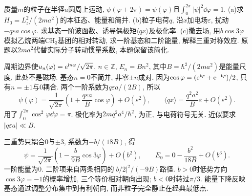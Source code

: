 \begin{exercise}
质量$m$的粒子在半径$a$圆周上运动, $\psi(\varphi+2\pi)=\psi(\varphi)$且$\int_0^{2\pi}|\psi|^2\dd\varphi=1$. (a)求$H_0=L_z^2/(2ma^2)$的本征态、能量和简并. (b)粒子电荷$q$, 沿$x$加电场$\varepsilon$, 扰动$-q\varepsilon a\cos\varphi$. 求基态一阶波函数、诱导偶极矩$\langle qx\rangle$及极化率. (c)撤去场, 用$b\cos3\varphi$模拟乙烷两端$\mathrm{CH}_3$基团的相对转动, 求一阶基态和二阶能量, 解释三重对称效应. 原题以$2ma^2$代替实际分子转动惯量系数, 本题保留该简化.
\end{exercise}
\begin{solution}
周期边界使$u_n(\varphi)=\mathrm e^{\mathrm i n\varphi}/\sqrt{2\pi}$, $n\in\mathbb Z$, $E_n=Bn^2$, 其中$B=\hbar^2/(2ma^2)$是能量尺度, 此处不是磁场. 基态$n=0$不简并, 非零$\pm n$成对. 因为$\cos\varphi=(\mathrm e^{\mathrm i\varphi}+\mathrm e^{-\mathrm i\varphi})/2$, 只有$n=\pm1$与0耦合. 两个一阶系数为$q\varepsilon a/(2B)$, 所以
\[
\psi(\varphi)=\frac1{\sqrt{2\pi}}\left(1+\frac{q\varepsilon a}{B}\cos\varphi\right)+O(\varepsilon^2),\qquad
\langle qx\rangle=\frac{q^2a^2}{B}\varepsilon+O(\varepsilon^2).
\]
用了$\int_0^{2\pi}\cos^2\varphi\dd\varphi=\pi$. 极化率为$2mq^2a^4/\hbar^2$, 为正, 与电荷符号无关. 近似要求$|q\varepsilon a|\ll B$.

三重势只耦合$0$与$\pm3$, 系数为$-b/(18B)$, 得
\[
\psi=\frac1{\sqrt{2\pi}}\left(1-\frac b{9B}\cos3\varphi\right)+O(b^2),\qquad
E_0=0-\frac{b^2}{18B}+O(b^3).
\]
一阶能量为0. 二阶项来自两条相同的$|b/2|^2/(-9B)$路径. $b>0$时低势方向$\cos3\varphi=-1$的概率增加, 三个等价相对朝向出现; $b<0$时转过$\pi/3$. 能量下降反映基态通过调整分布集中到有利朝向, 而非粒子完全静止在经典最低点.
\end{solution}


